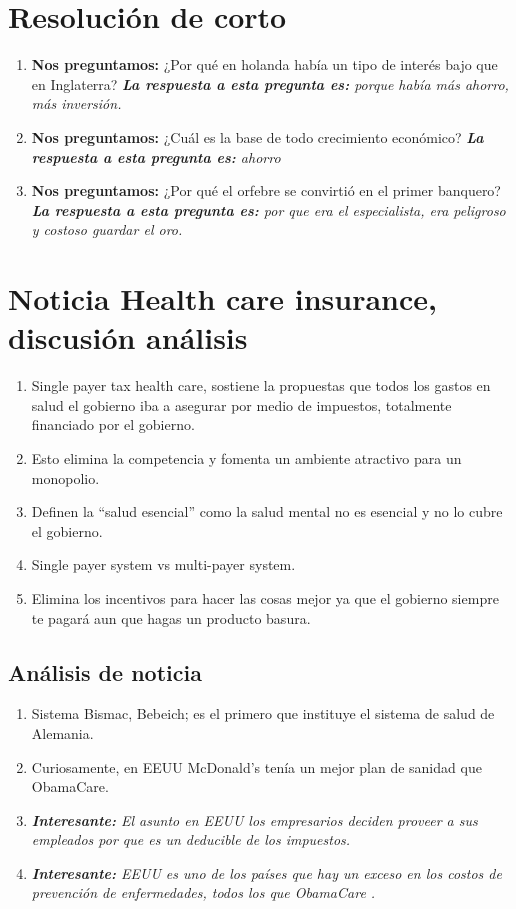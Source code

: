\section{Resolución de corto}
\begin{enumerate}
    \item \textbf{Nos preguntamos:} ¿Por qué en holanda había un tipo de interés bajo que en Inglaterra? \emph{\textbf{La respuesta a esta pregunta es: }porque había más ahorro, más inversión.}
    \item \textbf{Nos preguntamos:} ¿Cuál es la base de todo crecimiento económico? \emph{\textbf{La respuesta a esta pregunta es: }ahorro} 
    \item \textbf{Nos preguntamos:} ¿Por qué el orfebre se convirtió en el primer banquero? \emph{\textbf{La respuesta a esta pregunta es: }por que era el especialista, era peligroso y costoso guardar el oro.}
\end{enumerate}

\section{Noticia Health care insurance, discusión análisis}
\begin{enumerate}
    \item Single payer tax health care, sostiene la propuestas que todos los gastos en salud el gobierno iba a asegurar por medio de impuestos, totalmente financiado por el gobierno.
    \item Esto elimina la competencia y fomenta un ambiente atractivo para un monopolio.
    \item Definen la ``salud esencial'' como la salud mental no es esencial y no lo cubre el gobierno.
    \item Single payer system vs multi-payer system.
    \item Elimina los incentivos para hacer las cosas mejor ya que el gobierno siempre te pagará aun que hagas un producto basura.
\end{enumerate}
\subsection{Análisis de noticia}
\begin{enumerate}
    \item Sistema Bismac, Bebeich; es el primero que instituye el sistema de salud de Alemania.
    \item Curiosamente, en EEUU McDonald's tenía un mejor plan de sanidad que ObamaCare.
    \item \emph{\textbf{Interesante:} El asunto en EEUU los empresarios deciden proveer a sus empleados por que es un deducible de los impuestos.}
    \item \emph{\textbf{Interesante:} EEUU es uno de los países que hay un exceso en los costos de prevención de enfermedades, todos los que ObamaCare .}
\end{enumerate}

